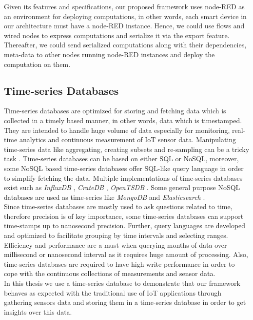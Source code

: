 \noindent Given its features and specifications, our proposed framework uses node-RED as an environment for deploying computations, in other words, each smart device in our architecture must have a node-RED instance. Hence, we could use  flows and wired nodes to express computations and serialize it via the export feature. Thereafter, we could send serialized computations along with their dependencies, meta-data  to other nodes running node-RED instances and deploy the computation on them. 

\subsection{Time-series Databases}

Time-series databases are optimized for storing  and fetching data which is collected in a timely based manner, in other words, data which is timestamped. They are intended to handle huge volume of data especially for monitoring, real-time analytics and continuous measurement of IoT sensor data. Manipulating time-series data like aggregating, creating subsets and re-sampling can be a tricky task \cite{Leighton2015}. Time-series databases can be based on either SQL or NoSQL, moreover, some NoSQL based time-series databases offer SQL-like query language in order to simplify fetching the data. Multiple implementations of time-series databases exist such as \textit{InfluxDB} \cite{Influxdb}, \textit{CrateDB } \cite{CrateDB},  \textit{OpenTSDB} \cite{Opentsdb}. Some general purpose NoSQL databases are used as time-series  like \textit{MongoDB} \cite{MongoDB} and \textit{Elasticsearch} \cite{Elasticsearch}.\\

\noindent Since time-series databases are mostly used to ask questions related to time, therefore precision is of key importance, some time-series databases can support time-stamps up to nanosecond precision. Further, query languages are developed and optimized to facilitate grouping by time intervals and selecting ranges. Efficiency and performance are a must when querying months of data over millisecond or nanosecond interval as it requires huge amount of processing. Also, time-series databases are required to have high write performance in order to cope with the continuous collections of measurements and sensor data.  \\

\noindent In this thesis we use a time-series database to demonstrate that our framework behaves as expected with the traditional use of IoT applications through gathering sensors data  and storing them in a time-series database in order to get insights over this data.
 

